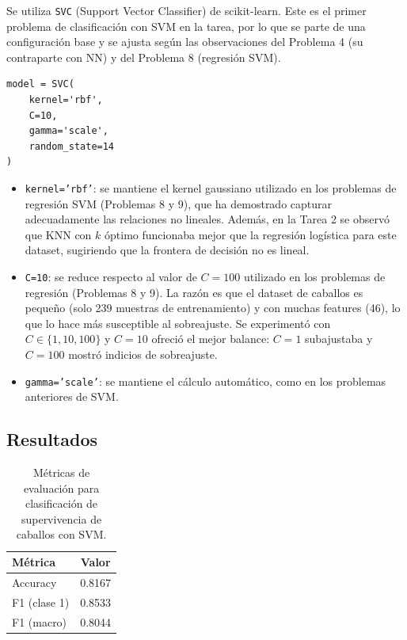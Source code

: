 \documentclass{article}
\begin{document}
Se utiliza \texttt{SVC} (Support Vector Classifier) de scikit-learn. Este es el primer problema de clasificación con SVM en la tarea, por lo que se parte de una configuración base y se ajusta según las observaciones del Problema 4 (su contraparte con NN) y del Problema 8 (regresión SVM).

\begin{lstlisting}
model = SVC(
    kernel='rbf',
    C=10,
    gamma='scale',
    random_state=14
)
\end{lstlisting}

\begin{itemize}
    \item \texttt{kernel='rbf'}: se mantiene el kernel gaussiano utilizado en los problemas de regresión SVM (Problemas 8 y 9), que ha demostrado capturar adecuadamente las relaciones no lineales. Además, en la Tarea 2 se observó que KNN con $k$ óptimo funcionaba mejor que la regresión logística para este dataset, sugiriendo que la frontera de decisión no es lineal.
    \item \texttt{C=10}: se reduce respecto al valor de $C=100$ utilizado en los problemas de regresión (Problemas 8 y 9). La razón es que el dataset de caballos es pequeño (solo 239 muestras de entrenamiento) y con muchas features (46), lo que lo hace más susceptible al sobreajuste. Se experimentó con $C \in \{1, 10, 100\}$ y $C=10$ ofreció el mejor balance: $C=1$ subajustaba y $C=100$ mostró indicios de sobreajuste.
    \item \texttt{gamma='scale'}: se mantiene el cálculo automático, como en los problemas anteriores de SVM.
\end{itemize}

\subsection{Resultados}

\begin{table}[H]
\centering
\begin{tabular}{lc}
\hline
\textbf{Métrica} & \textbf{Valor} \\
\hline
Accuracy         & 0.8167 \\
F1 (clase 1)     & 0.8533 \\
F1 (macro)       & 0.8044 \\
\hline
\end{tabular}
\caption{Métricas de evaluación para clasificación de supervivencia de caballos con SVM.}
\label{tab:p10_resultados}
\end{table}
\end{document}
